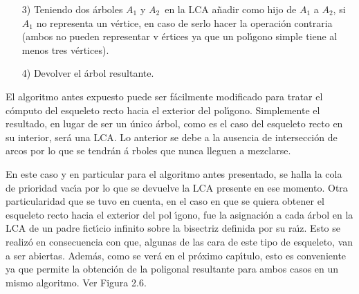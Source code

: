 \documentclass[12pt,english]{report}
\begin{document}
\begin{itemize}
\begin{itemize}
\begin{itemize}
\item[iv] remplazar $A_{l}$ por $A$ en la LCA

\item[v] computar la bisectriz de $A$

\item[vi] para el nuevo \'{a}rbol A y los sub\'arboles reci\'{e}n reinsertdos
en la LCA computar la intersecci\'{o}n v\'{a}lida con sus respectivos
adyacentes y almacenarla en la cola de prioridad as\'i como, el tipo de
mezcla correspondiente a cada una de ellas
\end{itemize}
\end{itemize}

\item[3)] Teniendo dos \'{a}rboles $A_{1}$ y $A_{2}$\ en la LCA a\~{n}adir
como hijo de $A_{1}$ a $A_{2}$, si $A_{1}$ no representa un v\'{e}rtice, en
caso de serlo hacer la operaci\'{o}n contraria (ambos no pueden representar v%
\'{e}rtices ya que un pol\'{\i}gono simple tiene al menos tres v\'{e}rtices).

\item[4)] Devolver el \'{a}rbol resultante.
\end{itemize}
\bigskip

El algoritmo antes expuesto puede ser f\'{a}cilmente modificado para tratar
el c\'{o}mputo del esqueleto recto hacia el exterior del pol\'{\i}gono.
Simplemente el resultado, en lugar de ser un \'{u}nico \'{a}rbol, como es el
caso del esqueleto recto en su interior, ser\'{a} una LCA. Lo anterior se
debe a la ausencia de intersecci\'{o}n de arcos por lo que se tendr\'an \'{a}%
rboles que nunca lleguen a mezclarse.

En este caso y en particular para el algoritmo antes presentado, se halla la cola de prioridad vac\'{\i}a por lo que se devuelve la
LCA presente en ese momento. Otra particularidad que se tuvo en cuenta, en
el caso en que se quiera obtener el esqueleto recto hacia el exterior del pol%
\'{\i}gono, fue la asignaci\'{o}n a cada \'{a}rbol en la LCA de un padre
fict\'{\i}cio infinito sobre la bisectriz definida por su ra\'{\i}z. Esto se
realiz\'{o} en consecuencia con que, algunas de las cara de este tipo de esqueleto, van
a ser abiertas. Adem\'{a}s, como se ver\'{a} en el pr\'{o}ximo cap\'{\i}tulo, 
esto es conveniente ya que permite la obtenci\'on de la poligonal resultante para ambos casos en un mismo algoritmo. Ver Figura 2.6.
\end{document}
